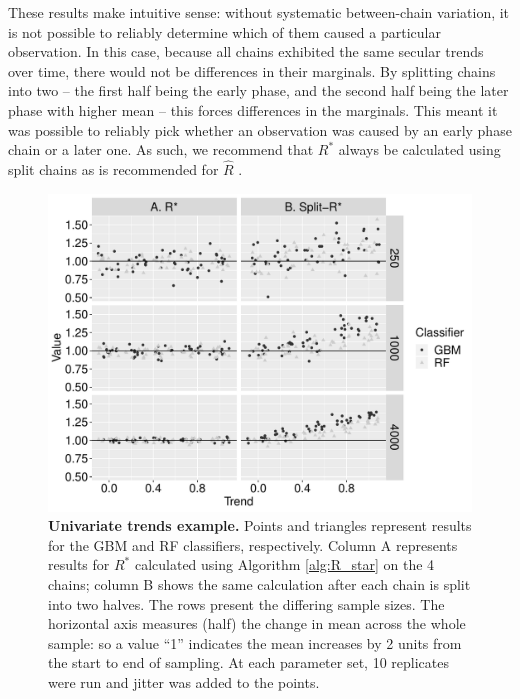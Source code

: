 \documentclass[ba]{imsart}
\numberwithin{equation}{section}
\theoremstyle{plain}
\begin{document}
\begin{supplement}
		These results make intuitive sense: without systematic between-chain variation, it is not possible to reliably determine which of them caused a particular observation. In this case, because all chains exhibited the same secular trends over time, there would not be differences in their marginals. By splitting chains into two -- the first half being the early phase, and the second half being the later phase with higher mean -- this forces differences in the marginals. This meant it was possible to reliably pick whether an observation was caused by an early phase chain or a later one. As such, we recommend that $R^*$ always be calculated using split chains as is recommended for $\widehat{R}$ \citep{carpenter2017stan,vehtari2019rank}.
		
		\begin{figure}[!htb]
			\centerline{\includegraphics[width=1.0\textwidth]{trends_all_dim.pdf}}
			\caption{\textbf{Univariate trends example.} Points and triangles represent results for the GBM and RF classifiers, respectively. Column A represents results for $R^*$ calculated using Algorithm \ref{alg:R_star} on the 4 chains; column B  shows the same calculation after each chain is split into two halves. The rows present the differing sample sizes. The horizontal axis measures (half) the change in mean across the whole sample: so a value ``1'' indicates the mean increases by 2 units from the start to end of sampling. At each parameter set, 10 replicates were run and jitter was added to the points.}
			\label{fig:trends_all_dim}
		\end{figure}
		

\end{supplement}
\end{document}

